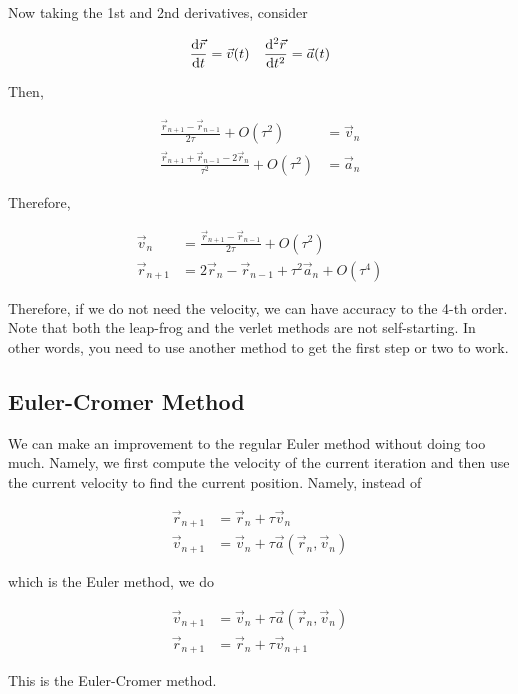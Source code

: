 \documentclass[]{article}
\begin{document}
Now taking the 1st and 2nd derivatives, consider

\[\dv{\vec{r}}{t} = \vec{v}(t) \quad \dv[2]{\vec{r}}{t} = \vec{a}(t) \]

Then, 

\begin{align*}
	\frac{\vec{r}_{n+1}-\vec{r}_{n-1}}{2\tau} + O(\tau^2) &= \vec{v}_n\\
	\frac{\vec{r}_{n+1}+\vec{r}_{n-1} - 2\vec{r}_n}{\tau^2} + O(\tau^2) &= \vec{a}_{n}
\end{align*}

Therefore,

\begin{align*}
	\vec{v}_n &= \frac{\vec{r}_{n+1}-\vec{r}_{n-1}}{2\tau} + O(\tau^2)\\
	\vec{r}_{n+1} &= 2\vec{r}_n - \vec{r}_{n-1} + \tau^2\vec{a}_n + O(\tau^4)
\end{align*}

Therefore, if we do not need the velocity, we can have accuracy to the 4-th order.\\

Note that both the leap-frog and the verlet methods are not self-starting. In other words, you need to use another method to get the first step or two to work.\\

\subsection{Euler-Cromer Method}\bigbreak

We can make an improvement to the regular Euler method without doing too much. Namely, we first compute the velocity of the current iteration and then use the current velocity to find the current position. Namely, instead of 

\begin{align*}
	\vec{r}_{n+1} &= \vec{r}_{n} + \tau\vec{v}_{n}\\
	\vec{v}_{n+1} &= \vec{v}_{n} + \tau\vec{a}(\vec{r}_{n}, \vec{v}_{n})
\end{align*}

which is the Euler method, we do

\begin{align*}
	\vec{v}_{n+1} &= \vec{v}_{n} + \tau\vec{a}(\vec{r}_{n}, \vec{v}_{n})\\
	\vec{r}_{n+1} &= \vec{r}_{n} + \tau\vec{v}_{n + 1}
\end{align*}

This is the Euler-Cromer method.
\end{document}

